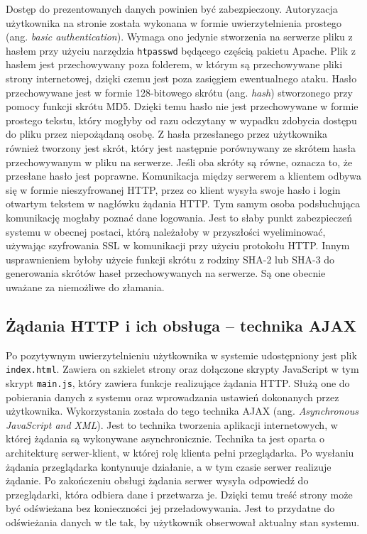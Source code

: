 \documentclass[a4paper,11pt,twoside]{article}
\begin{document}
Dostęp do prezentowanych danych powinien być zabezpieczony. Autoryzacja użytkownika na stronie została wykonana w formie uwierzytelnienia prostego (ang. \textit{basic authentication}). Wymaga ono jedynie stworzenia na serwerze pliku z hasłem przy użyciu narzędzia \texttt{htpasswd} będącego częścią pakietu Apache. Plik z hasłem jest przechowywany poza folderem, w którym są przechowywane pliki strony internetowej, dzięki czemu jest poza zasięgiem ewentualnego ataku. Hasło przechowywane jest w formie 128-bitowego skrótu (ang. \textit{hash}) stworzonego przy pomocy funkcji skrótu MD5\cite{apache-password}. Dzięki temu hasło nie jest przechowywane w formie prostego tekstu, który mogłyby od razu odczytany w wypadku zdobycia dostępu do pliku przez niepożądaną osobę. Z hasła przesłanego przez użytkownika również tworzony jest skrót, który jest następnie porównywany ze skrótem hasła przechowywanym w pliku na serwerze. Jeśli oba skróty są równe, oznacza to, że przesłane hasło jest poprawne. Komunikacja między serwerem a klientem odbywa się w formie nieszyfrowanej HTTP, przez co klient wysyła swoje hasło i login otwartym tekstem w nagłówku żądania HTTP\cite{http-auth}. Tym samym osoba podsłuchująca komunikację mogłaby poznać dane logowania. Jest to słaby punkt zabezpieczeń systemu w obecnej postaci, którą należałoby w przyszłości wyeliminować, używając szyfrowania SSL w komunikacji przy użyciu protokołu HTTP. Innym usprawnieniem byłoby użycie funkcji skrótu z rodziny SHA-2 lub SHA-3 do generowania skrótów haseł przechowywanych na serwerze. Są one obecnie uważane za niemożliwe do złamania.
 
\subsection{Żądania HTTP i ich obsługa -- technika AJAX}
Po pozytywnym uwierzytelnieniu użytkownika w systemie udostępniony jest plik \texttt{index.html}. Zawiera on szkielet strony oraz dołączone skrypty JavaScript w tym skrypt \texttt{main.js}, który zawiera funkcje realizujące żądania HTTP. Służą one do pobierania danych z systemu oraz wprowadzania ustawień dokonanych przez użytkownika. Wykorzystania została do tego technika AJAX (ang. \textit{Asynchronous JavaScript and XML}). Jest to technika tworzenia aplikacji internetowych, w której żądania są wykonywane asynchronicznie. Technika ta jest oparta o architekturę serwer-klient, w której rolę klienta pełni przeglądarka. Po wysłaniu żądania przeglądarka kontynuuje działanie, a w tym czasie serwer realizuje żądanie. Po zakończeniu obsługi żądania serwer wysyła odpowiedź do przeglądarki, która odbiera dane i przetwarza je. Dzięki temu treść strony może być odświeżana bez konieczności jej przeładowywania. Jest to przydatne do odświeżania danych w tle tak, by użytkownik obserwował aktualny stan systemu.
\end{document}
